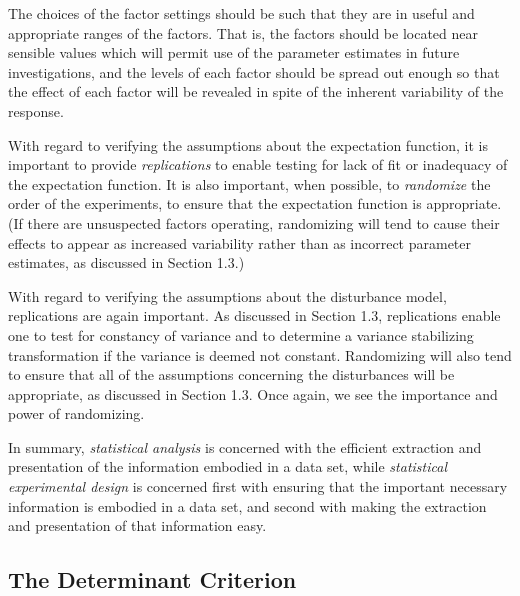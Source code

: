 The choices of the factor settings should be such that they are in
useful and appropriate ranges of the factors.
That is, the factors should be located near sensible
values which will permit use of the parameter estimates in future
investigations, and the levels of each factor should be spread
out enough so that the effect of each factor will be revealed in
spite of the inherent variability of the response.

With regard to
verifying the assumptions about the expectation
function, it is important to provide \emph{replications}
to enable testing for lack of fit or inadequacy of the
expectation function.
It is also important, when possible, to \emph{randomize}
the order of the
experiments, to ensure that the expectation function is appropriate.
(If there are unsuspected factors operating, randomizing will tend
to cause their effects to appear as increased variability rather
than as incorrect parameter estimates, as discussed in Section 1.3.)

With regard to
verifying the assumptions about the disturbance
model, replications are again important.
As discussed in Section 1.3, replications enable one to test for
constancy of variance and to determine a variance stabilizing
transformation if the variance is deemed not constant.
Randomizing will also tend to ensure that all of the
assumptions concerning the disturbances will be appropriate, as
discussed in Section 1.3.
Once again, we see the importance and power of randomizing.

In summary, \emph{statistical analysis} is concerned with the efficient
extraction and presentation of the information embodied in a data set,
while \emph{statistical experimental design}
is concerned first with
ensuring that the important necessary information is embodied in a data
set,
and second with making the extraction and presentation of that
information easy.

\subsection{The Determinant Criterion}

